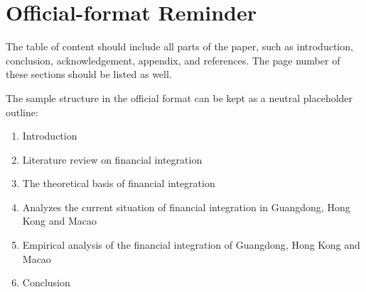 \chapter{Official-format Reminder}

The table of content should include all parts of the paper, such as introduction, conclusion, acknowledgement, appendix, and references. The page number of these sections should be listed as well.

The sample structure in the official format can be kept as a neutral placeholder outline:

\begin{enumerate}[label=\arabic*.]
    \item Introduction
    \item Literature review on financial integration
    \item The theoretical basis of financial integration
    \item Analyzes the current situation of financial integration in Guangdong, Hong Kong and Macao
    \item Empirical analysis of the financial integration of Guangdong, Hong Kong and Macao
    \item Conclusion
\end{enumerate}


